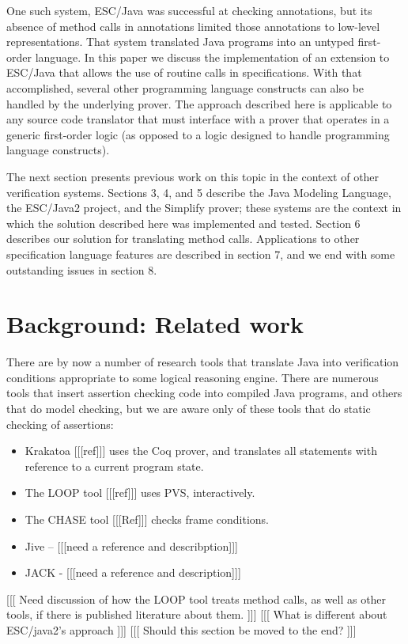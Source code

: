 \documentclass{sig-alternate}
\begin{document}
One such system,
ESC/Java \cite{ESCJava} was successful at checking annotations, but its
absence of method calls in annotations limited those annotations to
low-level representations.  That system translated Java programs into
an untyped first-order language.  In this paper we discuss the implementation
of an extension to ESC/Java that allows the use of routine calls in
specifications.  With that accomplished, several other programming
language constructs can also be handled by the underlying prover.
The approach described here is applicable to any source code translator
that must interface with a prover that operates in a generic first-order 
logic (as opposed to a logic designed to handle programming language
constructs).

The next section presents previous work on this topic in the context of other
verification systems.  Sections 3, 4, and 5 describe the Java Modeling
Language, the ESC/Java2 project, and the Simplify prover; these systems
are the context in which the solution described here was implemented 
and tested.  Section 6 describes our solution for translating method calls.
Applications to other specification language features are described in section 7,
and we end with some outstanding issues in section 8.

\section{Background: Related work}

There are by now a number of research tools that translate Java into verification conditions
appropriate to some logical reasoning engine.  There are numerous tools that insert
assertion checking code into compiled Java programs, and others that do model checking,
but
we are aware only of these tools that do static
checking of assertions:
\begin{itemize}
\item Krakatoa [[[ref]]] uses the Coq prover, and 
translates all statements with reference to a current program state. 
\item The LOOP tool [[[ref]]] uses PVS, interactively.  
\item The CHASE tool [[[Ref]]] checks frame conditions.
\item Jive -- [[[need a reference and describption]]]
\item JACK - [[[need a reference and description]]]
\end{itemize}


[[[ Need discussion of how the LOOP tool treats method calls, as well as other tools, if there is published literature about them. ]]]
[[[ What is different about ESC/java2's approach ]]]
[[[ Should this section be moved to the end? ]]]
\end{document}
